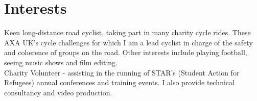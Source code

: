 \documentclass[11pt]{article}
\begin{document}
\section*{Interests}

Keen long-distance road cyclist, taking part in many charity cycle rides. These AXA UK's cycle challenges for which I am a lead cyclist in charge of the safety and coherence of groups on the road. Other interests include playing football, seeing music shows and film editing.\\

\noindent Charity Volunteer - assisting in the running of STAR's (Student Action for Refugees) annual conferences and training events.
I also provide technical consultancy and video production.

\end{document}

